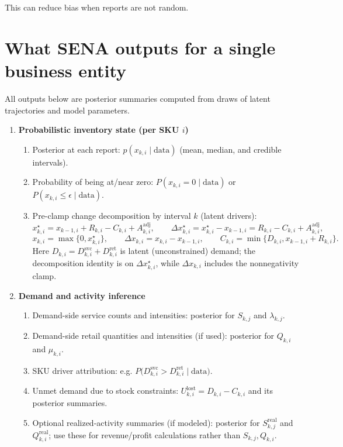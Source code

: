 \documentclass[11pt]{article}
\begin{document}
This can reduce bias when reports are not random.

\section{What SENA outputs for a single business entity}

All outputs below are posterior summaries computed from draws of latent trajectories
and model parameters.

\begin{enumerate}
  \item \textbf{Probabilistic inventory state (per SKU $i$)}
  \begin{enumerate}
    \item Posterior at each report: $p(x_{k,i}\mid\text{data})$ (mean, median, and credible intervals).
    \item Probability of being at/near zero: $P(x_{k,i}=0\mid\text{data})$ or $P(x_{k,i}\le \epsilon\mid\text{data})$.
    \item Pre-clamp change decomposition by interval $k$ (latent drivers):
    \[
      x^\star_{k,i}=x_{k-1,i}+R_{k,i}-C_{k,i}+A^{\mathrm{adj}}_{k,i},\qquad
      \Delta x^\star_{k,i}=x^\star_{k,i}-x_{k-1,i}=R_{k,i}-C_{k,i}+A^{\mathrm{adj}}_{k,i},
    \]
    \[
      x_{k,i}=\max\{0,x^\star_{k,i}\},\qquad
      \Delta x_{k,i}=x_{k,i}-x_{k-1,i},\qquad
      C_{k,i}=\min\{D_{k,i},x_{k-1,i}+R_{k,i}\}.
    \]
    Here $D_{k,i}=D^{\mathrm{svc}}_{k,i}+D^{\mathrm{ret}}_{k,i}$ is latent (unconstrained) demand; the decomposition identity is on $\Delta x^\star_{k,i}$, while $\Delta x_{k,i}$ includes the nonnegativity clamp.
  \end{enumerate}

  \item \textbf{Demand and activity inference}
  \begin{enumerate}
    \item Demand-side service counts and intensities: posterior for $S_{k,j}$ and $\lambda_{k,j}$.
    \item Demand-side retail quantities and intensities (if used): posterior for $Q_{k,i}$ and $\mu_{k,i}$.
    \item SKU driver attribution: e.g.
    $P\bigl(D^{\mathrm{svc}}_{k,i} > D^{\mathrm{ret}}_{k,i}\mid\text{data}\bigr)$.
    \item Unmet demand due to stock constraints:
    $U^{\mathrm{lost}}_{k,i}=D_{k,i}-C_{k,i}$ and its posterior summaries.
    \item Optional realized-activity summaries (if modeled): posterior for $S^{\mathrm{real}}_{k,j}$ and $Q^{\mathrm{real}}_{k,i}$; use these for revenue/profit calculations rather than $S_{k,j},Q_{k,i}$.
  \end{enumerate}


\end{enumerate}
\end{document}
